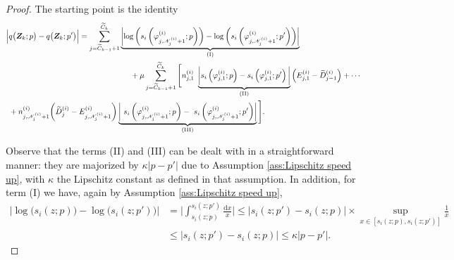 \documentclass[11pt]{article}
\newcommand{\jp}[1]{\footnote{J-P: #1}}
\theoremstyle{remark}
\theoremstyle{definition}
\newcommand{\bs}[1]{{\boldsymbol #1 }}
\numberwithin{equation}{section}
\begin{document}
\begin{proof}
    The starting point is the identity
    \begin{align}
        \Big\vert &q\big(\bs{Z}_k;p\big) - q\big(\bs{Z}_k;p'\big) \Big\vert = \sum_{j = \widetilde{C}_{k-1}+1}^{\widetilde{C}_k} \underbrace{\left\vert \log\left( s_i\left(\varphi^{(i)}_{j, {\mathscr N}^{(i)}_{j}+1}; p\right)\right) - \log\left( s_i\left(\varphi^{(i)}_{j, {\mathscr N}^{(i)}_{j}+1}; p'\right)\right) \right\vert}_{\text{(I)}} \notag
        \\
        &\hspace{5.5cm} + \mu \sum_{j = \widetilde{C}_{k-1}+1}^{\widetilde{C}_k} \Bigg[ n^{(i)}_{j,1} \  \underbrace{\bigg\vert s_i\left(\varphi^{(i)}_{j,1}; p\right) - s_i\left(\varphi^{(i)}_{j,1}; p'\right)\bigg\vert}_{\text{(II)}} \Big(E^{(i)}_{j,1} - \widetilde{D}^{(i)}_{j-1}\Big)
        + \cdots \notag
        \\
        &+ n^{(i)}_{j, {\mathscr N}^{(i)}_{j}+1} \bigg(\widetilde{D}^{(i)}_{j} - E^{(i)}_{j,{\mathscr N}^{(i)}_{j}+1}\bigg) \underbrace{\left\vert \ s_i\left(\varphi^{(i)}_{j, {\mathscr N}^{(i)}_{j}+1}; p\right) - \ s_i\left(\varphi^{(i)}_{j, {\mathscr N}^{(i)}_{j}+1}; p'\right)\right\vert}_{\text{(III)}} \Bigg].
    \end{align}

     Observe that  the terms (II) and (III) can be dealt with in a straightforward manner: they are majorized by $\kappa\big\vert p-p' \big\vert$ due to  Assumption \ref{ass:Lipschitz speed up}, with $\kappa$  the Lipschitz constant as defined in that assumption. In addition, for term (I) we have, again by Assumption \ref{ass:Lipschitz speed up},
    \begin{align*}
        \Big\vert \log\big(s_i(z;p)\big) - \log\big(s_i(z;p')\big) \Big\vert &= \Bigg\vert \int_{s_i(z;p)}^{s_i(z;p')} \frac{\mathrm{d}x}{x} \Bigg\vert 
       \leq \big\vert s_i(z;p') - s_i(z;p) \big\vert \times \sup_{x \in [s_i(z;p), s_i(z;p')]} \frac{1}{x}  
        \\
        &\leq \big\vert s_i(z;p') - s_i(z;p) \big\vert \leq \kappa \big\vert p-p' \big\vert .
    \end{align*}


\end{proof}
\end{document}
